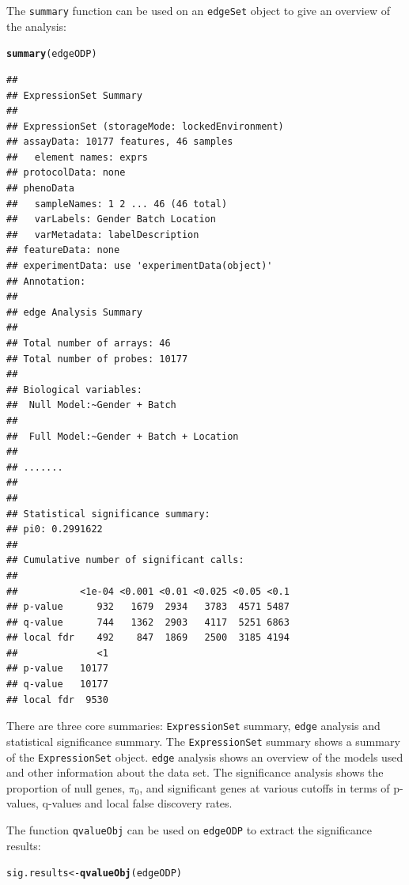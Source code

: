 \documentclass{article}\usepackage[]{graphicx}\usepackage[]{color}
\makeatletter
\newcommand{\hlstd}[1]{\textcolor[rgb]{0.345,0.345,0.345}{#1}}%
\newcommand{\hlkwb}[1]{\textcolor[rgb]{0.69,0.353,0.396}{#1}}%
\newcommand{\hlkwd}[1]{\textcolor[rgb]{0.737,0.353,0.396}{\textbf{#1}}}%
\newenvironment{kframe}{%
 \def\at@end@of@kframe{}%
 \ifinner\ifhmode%
  \def\at@end@of@kframe{\end{minipage}}%
  \begin{minipage}{\columnwidth}%
 \fi\fi%
 \def\FrameCommand##1{\hskip\@totalleftmargin \hskip-\fboxsep
 \colorbox{shadecolor}{##1}\hskip-\fboxsep
     \hskip-\linewidth \hskip-\@totalleftmargin \hskip\columnwidth}%
 \MakeFramed {\advance\hsize-\width
   \@totalleftmargin\z@ \linewidth\hsize
   \@setminipage}}%
 {\par\unskip\endMakeFramed%
 \at@end@of@kframe}
\newenvironment{knitrout}{}{} %
\makeatother
\begin{document}
The {\tt summary} function can be used on an {\tt edgeSet} object to give an overview of the analysis:
\begin{knitrout}
\color{fgcolor}\begin{kframe}
\begin{alltt}
\hlkwd{summary}\hlstd{(edgeODP)}
\end{alltt}
\begin{verbatim}
## 
## ExpressionSet Summary 
##  
## ExpressionSet (storageMode: lockedEnvironment)
## assayData: 10177 features, 46 samples 
##   element names: exprs 
## protocolData: none
## phenoData
##   sampleNames: 1 2 ... 46 (46 total)
##   varLabels: Gender Batch Location
##   varMetadata: labelDescription
## featureData: none
## experimentData: use 'experimentData(object)'
## Annotation:  
## 
## edge Analysis Summary 
##  
## Total number of arrays: 46 
## Total number of probes: 10177 
##  
## Biological variables: 
## 	Null Model:~Gender + Batch
## 
## 	Full Model:~Gender + Batch + Location
## 
## ....... 
##  
## 
## Statistical significance summary:
## pi0:	0.2991622	
## 
## Cumulative number of significant calls:
## 
##           <1e-04 <0.001 <0.01 <0.025 <0.05 <0.1
## p-value      932   1679  2934   3783  4571 5487
## q-value      744   1362  2903   4117  5251 6863
## local fdr    492    847  1869   2500  3185 4194
##              <1
## p-value   10177
## q-value   10177
## local fdr  9530
\end{verbatim}
\end{kframe}
\end{knitrout}
There are three core summaries: {\tt ExpressionSet} summary, {\tt edge} analysis and statistical significance summary. The {\tt ExpressionSet} summary shows a summary of the {\tt ExpressionSet} object. {\tt edge} analysis shows an overview of the models used and other information about the data set. The significance analysis shows the proportion of null genes, $\pi_{0}$, and significant genes at various cutoffs in terms of p-values, q-values and local false discovery rates.

The function {\tt qvalueObj} can be used on {\tt edgeODP} to extract the significance results:
\begin{knitrout}
\color{fgcolor}\begin{kframe}
\begin{alltt}
\hlstd{sig.results} \hlkwb{<-} \hlkwd{qvalueObj}\hlstd{(edgeODP)}
\end{alltt}
\end{kframe}
\end{knitrout}
\end{document}
